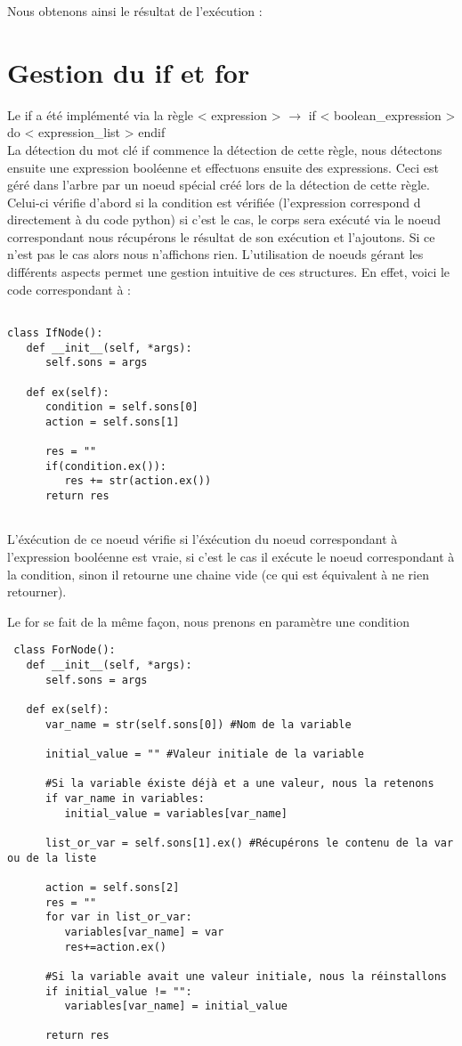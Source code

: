 \documentclass[a4paper,10pt]{article}
\begin{document}
Nous obtenons ainsi le résultat de l'exécution : 
\section{Gestion du \textbf{if} et \textbf{for}}
Le if a été implémenté via la règle < expression > $\rightarrow$ if < boolean\_expression > do < expression\_list > endif \\
La détection du mot clé if commence la détection de cette règle, nous détectons ensuite une expression booléenne et effectuons ensuite des expressions. Ceci
est géré dans l'arbre par un noeud spécial créé lors de la détection de cette règle. Celui-ci vérifie d'abord si la condition est vérifiée (l'expression correspond d
directement à du code python) si c'est le cas, le corps sera exécuté via le noeud correspondant nous récupérons le résultat de son exécution et l'ajoutons.
Si ce n'est pas le cas alors nous n'affichons rien. L'utilisation de noeuds gérant les différents aspects permet une gestion intuitive de ces structures. En effet,
voici le code correspondant à :
\begin{verbatim}

class IfNode():
   def __init__(self, *args):
      self.sons = args
         
   def ex(self):
      condition = self.sons[0]
      action = self.sons[1]

      res = ""
      if(condition.ex()):
         res += str(action.ex())
      return res
 
\end{verbatim}
L'éxécution de ce noeud vérifie si l'éxécution du noeud correspondant à l'expression booléenne est vraie, si c'est le cas il exécute le noeud correspondant à
la condition, sinon il retourne une chaine vide (ce qui est équivalent à ne rien retourner).

Le for se fait de la même façon, nous prenons en paramètre une condition 
\begin{verbatim}
 class ForNode():
   def __init__(self, *args):
      self.sons = args
         
   def ex(self):
      var_name = str(self.sons[0]) #Nom de la variable

      initial_value = "" #Valeur initiale de la variable

      #Si la variable éxiste déjà et a une valeur, nous la retenons
      if var_name in variables:
         initial_value = variables[var_name]

      list_or_var = self.sons[1].ex() #Récupérons le contenu de la var ou de la liste
      
      action = self.sons[2]
      res = ""
      for var in list_or_var:
         variables[var_name] = var
         res+=action.ex()

      #Si la variable avait une valeur initiale, nous la réinstallons
      if initial_value != "":
         variables[var_name] = initial_value

      return res
\end{verbatim}
\end{document}
